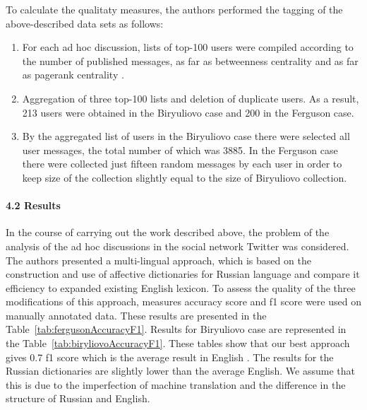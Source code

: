 To calculate the qualitaty measures, the authors performed the tagging of the above-described data sets as follows:

\begin{enumerate}
	\item For each ad hoc discussion, lists of top-100 users were compiled according to the number of published messages, as far as betweenness centrality and as far as pagerank centrality \cite{BodrunovaLitvinenkoBlekanov}.
	\item Aggregation of three top-100 lists and deletion of duplicate users. As a result, 213 users were obtained in the Biryuliovo case and 200 in the Ferguson case.
	\item By the aggregated list of users in the Biryuliovo case there were selected all user messages, the total number of which was 3885. In the Ferguson case there were collected just fifteen random messages by each user in order to keep size of the collection slightly equal to the size of Biryuliovo collection.
\end{enumerate}

\paragraph{4.2 Results}
In the course of carrying out the work described above, the problem of the analysis of the ad hoc discussions in the social network Twitter was considered. The authors presented a multi-lingual approach, which is based on the construction and use of affective dictionaries for Russian language and compare it efficiency to expanded existing English lexicon. To assess the quality of the three modifications of this approach, measures accuracy score and f1 score were used on manually annotated data. These results are presented in the Table~\cref{tab:fergusonAccuracyF1}. Results for Biryuliovo case are represented in the Table~\cref{tab:biryliovoAccuracyF1}. These tables show that our best approach gives 0.7 f1 score which is the average result in English \cite{KingHopkins,RavichandranRao}. The results for the Russian dictionaries are slightly lower than the average English. We assume that this is due to the imperfection of machine translation and the difference in the structure of Russian and English.

